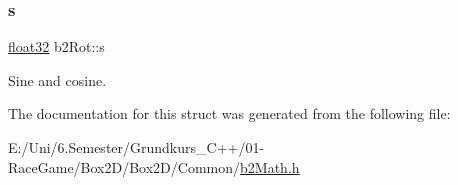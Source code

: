 \mbox{\label{structb2_rot_a15725ce0a89cc735ad90687b4c0f4dce}} 
\subsubsection{\texorpdfstring{s}{s}}
{\footnotesize\ttfamily \mbox{\hyperlink{b2_settings_8h_aacdc525d6f7bddb3ae95d5c311bd06a1}{float32}} b2\+Rot\+::s}



Sine and cosine. 



The documentation for this struct was generated from the following file\+:\begin{DoxyCompactItemize}
\item 
E\+:/\+Uni/6.\+Semester/\+Grundkurs\+\_\+\+C++/01-\/\+Race\+Game/\+Box2\+D/\+Box2\+D/\+Common/\mbox{\hyperlink{b2_math_8h}{b2\+Math.\+h}}\end{DoxyCompactItemize}
